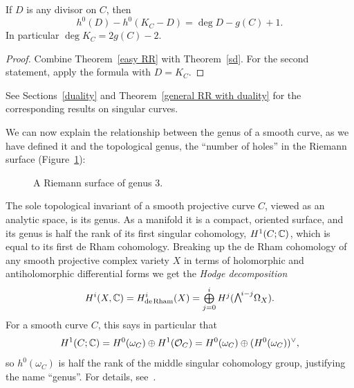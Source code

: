 \begin{theorem}\label{RR theorem}
If $D$ is any divisor on $C$, then 
$$
h^0(D) - h^0(K_C -D) = \deg D - g(C) +1.
$$
In particular $\deg K_C = 2g(C) -2$.
\end{theorem}

\begin{proof}
Combine Theorem~\ref{easy RR} with Theorem~\ref{sd}. For the second statement,
apply the formula with $D = K_C$.
\end{proof}

See Sections~\ref{duality} and Theorem~\ref{general RR with duality} for the corresponding results on singular curves.

We can now explain the relationship between the genus of a smooth curve, as we have defined it and the 
topological genus, the ``number of holes'' in the Riemann surface (Figure~\ref{RiemannSurface}):


\begin{figure}   %
\vskip-20pt
\vskip-15pt
\caption{A Riemann surface of genus 3.
}
\label{RiemannSurface}
\end{figure}


\begin{fact}
The sole topological invariant of a smooth projective curve $C$,
viewed as an analytic space, is its genus. As a manifold it is a
compact, oriented surface, and its genus is half the rank of its first
singular cohomology, $H^{1}(C; {\mathbb C})$, which is equal to its first 
de Rham 
cohomology.
Breaking up the de Rham cohomology of any smooth projective complex variety $X$ in terms of holomorphic and antiholomorphic differential
forms we get the \emph{Hodge decomposition}
$$
H^i(X,\CC) = H^i_{\mathrm{de\,Rham}}(X) = 
\tsty\bigoplus\limits_{j=0}^i H^j(\mwedge^{i-j} \Omega_X).
$$
For a smooth curve $C$, this says in  particular that
$$
H^1(C; {\mathbb C}) = H^0(\omega_C)\oplus H^1({\mathcal O}_C) = H^0(\omega_C)\oplus (H^0(\omega_C))^\vee, 
$$
so $ h^0(\omega_C)$ is half the rank of the middle singular cohomology
group, justifying the name ``genus''. For details, 
see~\cite[p.\,116]{Griffiths-Harris1978}.
\end{fact}

